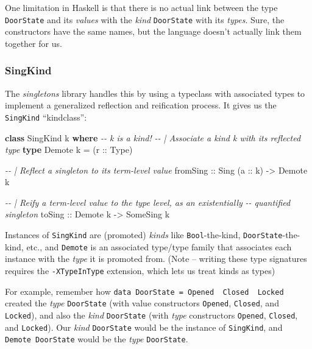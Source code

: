 \documentclass[]{article}
\newenvironment{Shaded}{}{}
\newcommand{\CommentTok}[1]{\textcolor[rgb]{0.38,0.63,0.69}{\textit{#1}}}
\newcommand{\DataTypeTok}[1]{\textcolor[rgb]{0.56,0.13,0.00}{#1}}
\newcommand{\KeywordTok}[1]{\textcolor[rgb]{0.00,0.44,0.13}{\textbf{#1}}}
\newcommand{\NormalTok}[1]{#1}
\newcommand{\OtherTok}[1]{\textcolor[rgb]{0.00,0.44,0.13}{#1}}
\begin{document}
One limitation in Haskell is that there is no actual link between the type
\texttt{DoorState} and its \emph{values} with the \emph{kind} \texttt{DoorState}
with its \emph{types}. Sure, the constructors have the same names, but the
language doesn't actually link them together for us.

\hypertarget{singkind}{%
\subsubsection{SingKind}\label{singkind}}

The \emph{singletons} library handles this by using a typeclass with associated
types to implement a generalized reflection and reification process. It gives us
the \texttt{SingKind} ``kindclass'':

\begin{Shaded}
\begin{Highlighting}[]
\KeywordTok{class} \DataTypeTok{SingKind}\NormalTok{ k }\KeywordTok{where}      \CommentTok{{-}{-} \textasciigrave{}k\textasciigrave{} is a kind!}
    \CommentTok{{-}{-} | Associate a kind k with its reflected type}
    \KeywordTok{type} \DataTypeTok{Demote}\NormalTok{ k }\OtherTok{=}\NormalTok{ (}\OtherTok{r ::} \DataTypeTok{Type}\NormalTok{)}

    \CommentTok{{-}{-} | Reflect a singleton to its term{-}level value}
\OtherTok{    fromSing ::} \DataTypeTok{Sing}\NormalTok{ (}\OtherTok{a ::}\NormalTok{ k) }\OtherTok{{-}>} \DataTypeTok{Demote}\NormalTok{ k}

    \CommentTok{{-}{-} | Reify a term{-}level value to the type level, as an existentially}
    \CommentTok{{-}{-} quantified singleton}
\OtherTok{    toSing ::} \DataTypeTok{Demote}\NormalTok{ k }\OtherTok{{-}>} \DataTypeTok{SomeSing}\NormalTok{ k}
\end{Highlighting}
\end{Shaded}

Instances of \texttt{SingKind} are (promoted) \emph{kinds} like
\texttt{Bool}-the-kind, \texttt{DoorState}-the-kind, etc., and \texttt{Demote}
is an associated type/type family that associates each instance with the
\emph{type} it is promoted from. (Note -- writing these type signatures requires
the \texttt{-XTypeInType} extension, which lets us treat kinds as types)

For example, remember how
\texttt{data\ DoorState\ =\ Opened\ \textbar{}\ Closed\ \textbar{}\ Locked}
created the \emph{type} \texttt{DoorState} (with value constructors
\texttt{Opened}, \texttt{Closed}, and \texttt{Locked}), and also the \emph{kind}
\texttt{DoorState} (with \emph{type} constructors
\texttt{\textquotesingle{}Opened}, \texttt{\textquotesingle{}Closed}, and
\texttt{\textquotesingle{}Locked}). Our \emph{kind} \texttt{DoorState} would be
the instance of \texttt{SingKind}, and \texttt{Demote\ DoorState} would be the
\emph{type} \texttt{DoorState}.
\end{document}
